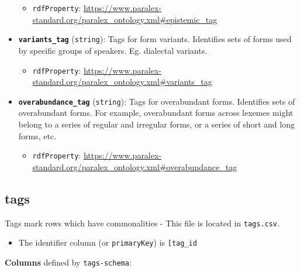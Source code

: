 \begin{itemize}
  \begin{itemize}
  \tightlist
  \item
    \texttt{rdfProperty}:
    \url{https://www.paralex-standard.org/paralex_ontology.xml\#epistemic_tag}
  \end{itemize}
\item
  \textbf{\texttt{variants\_tag}} (\texttt{string}): Tags for form
  variants. Identifies sets of forms used by specific groups of
  speakers. Eg. dialectal variants.

  \begin{itemize}
  \tightlist
  \item
    \texttt{rdfProperty}:
    \url{https://www.paralex-standard.org/paralex_ontology.xml\#variants_tag}
  \end{itemize}
\item
  \textbf{\texttt{overabundance\_tag}} (\texttt{string}): Tags for
  overabundant forms. Identifies sets of overabundant forms. For
  example, overabundant forms across lexemes might belong to a series of
  regular and irregular forms, or a series of short and long forms, etc.

  \begin{itemize}
  \tightlist
  \item
    \texttt{rdfProperty}:
    \url{https://www.paralex-standard.org/paralex_ontology.xml\#overabundance_tag}
  \end{itemize}
\end{itemize}

\hypertarget{tags}{%
\subsection{\texorpdfstring{\textbf{tags}}{tags}}\label{tags}}

Tags mark rows which have commonalities - This file is located in
\texttt{tags.csv}.

\begin{itemize}
\tightlist
\item
  The identifier column (or \texttt{primaryKey}) is
  \texttt{{[}\textquotesingle{}tag\_id\textquotesingle{}{]}}
\end{itemize}

\textbf{Columns} defined by \texttt{tags-schema}:

